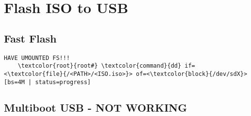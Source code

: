 \documentclass[10pt, a4paper, onecolumn, openany]{book}         %
\begin{document}
\section{Flash ISO to USB}
\subsection{Fast Flash}
\begin{Verbatim}[commandchars=\\\{\}]
HAVE UMOUNTED FS!!!
    \textcolor{root}{root#} \textcolor{command}{dd} if=<\textcolor{file}{/<PATH>/<ISO.iso>}> of=<\textcolor{block}{/dev/sdX}> [bs=4M | status=progress]
\end{Verbatim}


\subsection{Multiboot USB - NOT WORKING}
\end{document}
